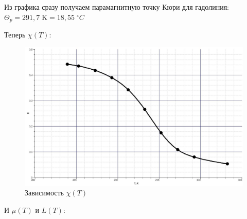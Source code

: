 \documentclass[a4paper,12pt]{article} %
\begin{document}
Из графика сразу получаем парамагнитную точку Кюри для гадолиния: $\boxed{\Theta_p = 291,7 \; \text{K}  = 18,55 \; ^\circ C}$

\newpage
Теперь $\chi (T):$

\begin{figure}[h!]
	\centering
	\includegraphics[scale=0.5]{Pictures/chi(T).jpg}
	\caption{Зависимость $\chi (T)$}
\end{figure}


И $\mu (T)$ и $L(T)$:
\end{document}

